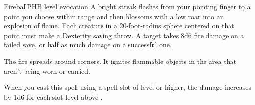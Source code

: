 \begin{spell}{Fireball}{PHB}{ level evocation}
{
}
A bright streak flashes from your pointing finger to a
point you choose within range and then blossoms with
a low roar into an explosion of flame. Each creature
in a 20-foot-radius sphere centered on that point must
make a Dexterity saving throw. A target takes 8d6
fire damage on a failed save, or half as much damage on a
successful one.

The fire spreads around corners. It ignites flammable
objects in the area that aren't being worn or carried.

 When you cast this spell using a
spell slot of  level or higher, the damage increases by
1d6 for each slot level above .
\end{spell}